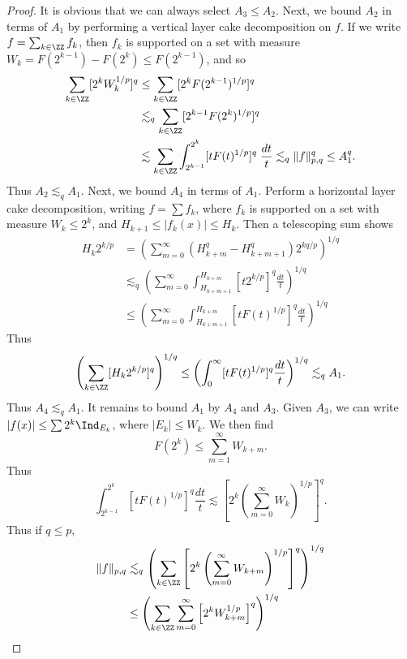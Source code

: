 \begin{proof}
    It is obvious that we can always select $A_3 \leq A_2$. Next, we bound $A_2$ in terms of $A_1$ by performing a vertical layer cake decomposition on $f$. If we write $f = \sum_{k \in \ZZ} f_k$, then $f_k$ is supported on a set with measure $W_k = F(2^{k-1}) - F(2^k) \leq F(2^{k-1})$, and so
    \begin{align*}
        \sum_{k \in \ZZ} [2^k W_k^{1/p}]^q &\leq \sum_{k \in \ZZ} [2^k F(2^{k-1})^{1/p}]^q\\
        &\lesssim_q \sum_{k \in \ZZ} [2^{k-1} F(2^k)^{1/p}]^q\\
        &\lesssim \sum_{k \in \ZZ} \int_{2^{k-1}}^{2^k} [tF(t)^{1/p}]^q\; \frac{dt}{t} \lesssim_q \| f \|_{p,q}^q \leq A_1^q.
    \end{align*}
    Thus $A_2 \lesssim_q A_1$. Next, we bound $A_4$ in terms of $A_1$. Perform a horizontal layer cake decomposition, writing $f = \sum f_k$, where $f_k$ is supported on a set with measure $W_k \leq 2^k$, and $H_{k+1} \leq |f_k(x)| \leq H_k$. Then a telescoping sum shows
    \begin{align*}
        H_k 2^{k/p} &= \left( \sum_{m = 0}^\infty (H_{k+m}^q - H_{k+m+1}^q) 2^{kq /p} \right)^{1/q}\\
        &\lesssim_q \left( \sum_{m = 0}^\infty \int_{H_{k+m+1}}^{H_{k+m}} [t 2^{k/p}]^q \frac{dt}{t} \right)^{1/q}\\
        &\leq \left( \sum_{m = 0}^\infty \int_{H_{k+m+1}}^{H_{k+m}} [t F(t)^{1/p}]^q \frac{dt}{t} \right)^{1/q}
    \end{align*}
    Thus
    \[ \left( \sum_{k \in \ZZ} [H_k 2^{k/p}]^q \right)^{1/q} \leq \left( \int_0^\infty [t F(t)^{1/p}]^q \frac{dt}{t} \right)^{1/q} \lesssim_q A_1. \]
    Thus $A_4 \lesssim_q A_1$. It remains to bound $A_1$ by $A_4$ and $A_3$. Given $A_3$, we can write $|f(x)| \leq \sum 2^k \Ind_{E_k}$, where $|E_k| \leq W_k$. We then find
    \[ F(2^k) \leq \sum_{m = 1}^\infty W_{k+m}. \]
    Thus
    \[ \int_{2^{k-1}}^{2^k} [t F(t)^{1/p}]^q \frac{dt}{t} \lesssim \left[ 2^k \left(\sum_{m = 0}^\infty W_k \right)^{1/p} \right]^q. \]
    Thus if $q \leq p$,
    \begin{align*}
        \| f \|_{p,q} &\lesssim_q \left( \sum_{k \in \ZZ} \left[2^k \left( \sum_{m = 0}^\infty W_{k+m} \right)^{1/p} \right]^q \right)^{1/q}\\
        &\leq \left( \sum_{k \in \ZZ} \sum_{m = 0}^\infty \left[ 2^k W_{k+m}^{1/p} \right]^q \right)^{1/q}\\

\end{align*}
\end{proof}
